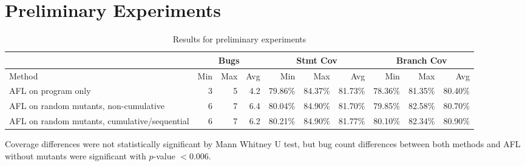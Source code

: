 \section{Preliminary Experiments}

\begin{table*}
  \begin{centering}
  \begin{tabular}{l||r|r|r||r|r|r||r|r|r}
    & \multicolumn{3}{|c||}{Bugs} & \multicolumn{3}{|c||}{Stmt Cov} &
                                                                    \multicolumn{3}{|c}{Branch Cov} \\
    \hline
  Method & Min & Max  & Avg & Min & Max & Avg
                                                                  
  & Min & Max & Avg \\
  \hline
  AFL on program only & 3 & 5 & 4.2 & 79.86\% & 84.37\% & 81.73\% &
                                                                    78.36\%
                                  & 81.35\% & 80.40\%\\
  \hline
  AFL on random mutants, non-cumulative  & 6 & 7 & 6.4 & 80.04\% &
                                                                   84.90\%
                      & 81.70\% & 79.85\% & 82.58\% & 80.70\%\\
  \hline
  AFL on random mutants, cumulative/sequential & 6 & 7 & 6.2 & 80.21\%
                                                               &
                                                                 84.90\%
                      & 81.77\%
  & 80.10\% & 82.34\% & 80.90\%\\
  \hline
  \end{tabular}
  \end{centering}
\caption{Results for preliminary experiments}
\end{table*}

Coverage differences were not statistically significant by Mann
Whitney U test, but bug count differences between both methods and AFL
without mutants were significant with $p$-value $< 0.006$.